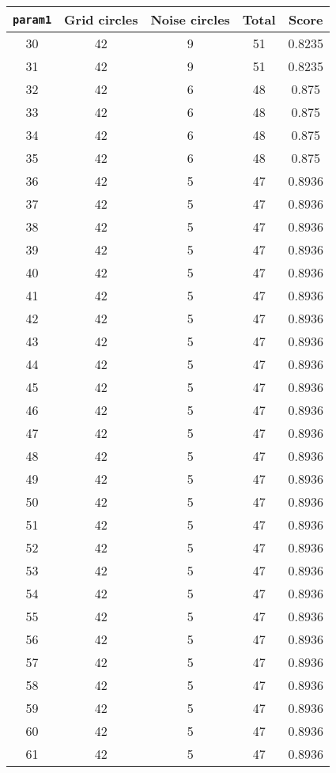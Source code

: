 \documentclass[letterpaper, 12pt]{article}
\begin{document}
\begin{longtable}{|c|c|c|c|c|}
\hline
\textbf{\texttt{param1}} & \textbf{Grid circles} & \textbf{Noise circles} & \textbf{Total} & \textbf{Score} \\
\hline
30 & 42 & 9 & 51 & 0.8235 \\
\hline
31 & 42 & 9 & 51 & 0.8235 \\
\hline
32 & 42 & 6 & 48 & 0.875 \\
\hline
33 & 42 & 6 & 48 & 0.875 \\
\hline
34 & 42 & 6 & 48 & 0.875 \\
\hline
35 & 42 & 6 & 48 & 0.875 \\
\hline
36 & 42 & 5 & 47 & 0.8936 \\
\hline
37 & 42 & 5 & 47 & 0.8936 \\
\hline
38 & 42 & 5 & 47 & 0.8936 \\
\hline
39 & 42 & 5 & 47 & 0.8936 \\
\hline
40 & 42 & 5 & 47 & 0.8936 \\
\hline
41 & 42 & 5 & 47 & 0.8936 \\
\hline
42 & 42 & 5 & 47 & 0.8936 \\
\hline
43 & 42 & 5 & 47 & 0.8936 \\
\hline
44 & 42 & 5 & 47 & 0.8936 \\
\hline
45 & 42 & 5 & 47 & 0.8936 \\
\hline
46 & 42 & 5 & 47 & 0.8936 \\
\hline
47 & 42 & 5 & 47 & 0.8936 \\
\hline
48 & 42 & 5 & 47 & 0.8936 \\
\hline
49 & 42 & 5 & 47 & 0.8936 \\
\hline
50 & 42 & 5 & 47 & 0.8936 \\
\hline
51 & 42 & 5 & 47 & 0.8936 \\
\hline
52 & 42 & 5 & 47 & 0.8936 \\
\hline
53 & 42 & 5 & 47 & 0.8936 \\
\hline
54 & 42 & 5 & 47 & 0.8936 \\
\hline
55 & 42 & 5 & 47 & 0.8936 \\
\hline
56 & 42 & 5 & 47 & 0.8936 \\
\hline
57 & 42 & 5 & 47 & 0.8936 \\
\hline
58 & 42 & 5 & 47 & 0.8936 \\
\hline
59 & 42 & 5 & 47 & 0.8936 \\
\hline
60 & 42 & 5 & 47 & 0.8936 \\
\hline
61 & 42 & 5 & 47 & 0.8936 \\

\end{longtable}
\end{document}
